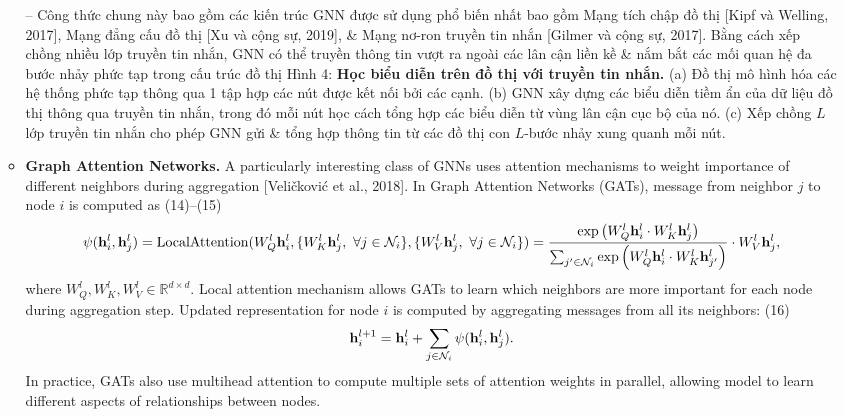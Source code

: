 \documentclass{article}
\begin{document}
\begin{itemize}
\begin{itemize}
        -- Công thức chung này bao gồm các kiến trúc GNN được sử dụng phổ biến nhất bao gồm Mạng tích chập đồ thị [Kipf và Welling, 2017], Mạng đẳng cấu đồ thị [Xu và cộng sự, 2019], \& Mạng nơ-ron truyền tin nhắn [Gilmer và cộng sự, 2017]. Bằng cách xếp chồng nhiều lớp truyền tin nhắn, GNN có thể truyền thông tin vượt ra ngoài các lân cận liền kề \& nắm bắt các mối quan hệ đa bước nhảy phức tạp trong cấu trúc đồ thị {\sf Hình 4: {\bf Học biểu diễn trên đồ thị với truyền tin nhắn.} (a) Đồ thị mô hình hóa các hệ thống phức tạp thông qua 1 tập hợp các nút được kết nối bởi các cạnh. (b) GNN xây dựng các biểu diễn tiềm ẩn của dữ liệu đồ thị thông qua truyền tin nhắn, trong đó mỗi nút học cách tổng hợp các biểu diễn từ vùng lân cận cục bộ của nó. (c) Xếp chồng $L$ lớp truyền tin nhắn cho phép GNN gửi \& tổng hợp thông tin từ các đồ thị con $L$-bước nhảy xung quanh mỗi nút.}
        \item {\bf Graph Attention Networks.} A particularly interesting class of GNNs uses attention mechanisms to weight importance of different neighbors during aggregation [Veličković et al., 2018]. In Graph Attention Networks (GATs), message from neighbor $j$ to node $i$ is computed as (14)--(15)
        \begin{equation*}
            \psi({\bf h}_i^l,{\bf h}_j^l) = {\rm LocalAttention}(W_Q^l{\bf h}_i^l,\{W_K^l{\bf h}_j^l,\ \forall j\in{\cal N}_i\},\{W_V^l{\bf h}_j^l,\ \forall j\in{\cal N}_i\}) = \frac{\exp\left(W_Q^l{\bf h}_i^l\cdot W_K^l{\bf h}_j^l\right)}{\sum_{j'\in{\cal N}_i} \exp\left(W_Q^l{\bf h}_i^l\cdot W_K^l{\bf h}_{j'}^l\right)}\cdot W_V^l{\bf h}_j^l,
        \end{equation*}
        where $W_Q^l,W_K^l,W_V^l\in\mathbb{R}^{d\times d}$. Local attention mechanism allows GATs to learn which neighbors are more important for each node during aggregation step. Updated representation for node $i$ is computed by aggregating messages from all its neighbors: (16)
        \begin{equation*}
            {\bf h}_i^{l + 1} = {\bf h}_i^l + \sum_{j\in{\cal N}_i} \psi({\bf h}_i^l,{\bf h}_j^l).
        \end{equation*}
        In practice, GATs also use multihead attention to compute multiple sets of attention weights in parallel, allowing model to learn different aspects of relationships between nodes.


\end{itemize}
\end{itemize}
\end{document}
